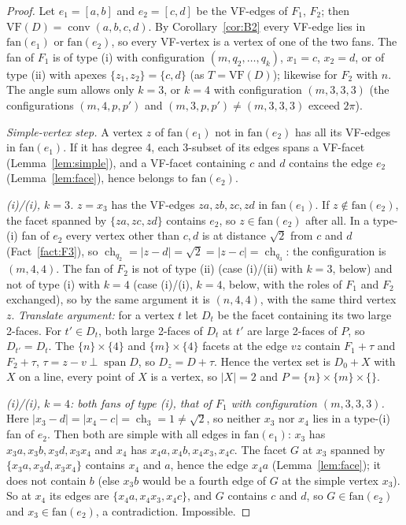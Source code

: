\documentclass[11pt]{article}
\theoremstyle{definition}
\theoremstyle{remark}
\newcommand{\VF}{\mathrm{VF}}
\newcommand{\conv}{\operatorname{conv}}
\newcommand{\spn}{\operatorname{span}}
\newcommand{\ch}{\operatorname{ch}}
\begin{document}
\begin{proof}
Let $e_1=[a,b]$ and $e_2=[c,d]$ be the VF-edges of $F_1$, $F_2$; then
$\VF(D)=\conv(a,b,c,d)$. By Corollary~\ref{cor:B2} every VF-edge lies in
$\mathrm{fan}(e_1)$ or $\mathrm{fan}(e_2)$, so every VF-vertex is a vertex of
one of the two fans. The fan of $F_1$ is of type (i) with configuration
$(m,q_2,\dots,q_k)$, $x_1=c$, $x_2=d$, or of type (ii) with apexes
$\{z_1,z_2\}=\{c,d\}$ (as $T=\VF(D)$); likewise for $F_2$ with $n$. The angle
sum allows only $k=3$, or $k=4$ with configuration $(m,3,3,3)$ (the
configurations $(m,4,p,p')$ and $(m,3,p,p')\ne(m,3,3,3)$ exceed $2\pi$).

\emph{Simple-vertex step.} A vertex $z$ of $\mathrm{fan}(e_1)$ not in
$\mathrm{fan}(e_2)$ has all its VF-edges in $\mathrm{fan}(e_1)$. If it has
degree 4, each 3-subset of its edges spans a VF-facet
(Lemma~\ref{lem:simple}), and a VF-facet containing $c$ and $d$ contains
the edge $e_2$ (Lemma~\ref{lem:face}), hence belongs to $\mathrm{fan}(e_2)$.

\emph{(i)/(i), $k=3$.} $z=x_3$ has the VF-edges $za,zb,zc,zd$ in
$\mathrm{fan}(e_1)$. If $z\notin\mathrm{fan}(e_2)$, the facet spanned by
$\{za,zc,zd\}$ contains $e_2$, so $z\in\mathrm{fan}(e_2)$ after all. In a
type-(i) fan of $e_2$ every vertex other than $c,d$ is at distance $\sqrt2$
from $c$ and $d$ (Fact~\ref{fact:F3}), so
$\ch_{q_2}=|z-d|=\sqrt2=|z-c|=\ch_{q_3}$: the configuration is $(m,4,4)$. The
fan of $F_2$ is not of type (ii) (case (i)/(ii) with $k=3$, below) and
not of type (i) with $k=4$ (case (i)/(i), $k=4$, below, with the roles of
$F_1$ and $F_2$ exchanged), so by the same argument it is $(n,4,4)$, with the
same third vertex $z$. \emph{Translate argument:} for a vertex $t$ let $D_t$ be the
facet containing its two large 2-faces. For $t'\in D_t$, both large 2-faces
of $D_t$ at $t'$ are large 2-faces of $P$, so $D_{t'}=D_t$. The
$\{n\}\times\{4\}$ and $\{m\}\times\{4\}$ facets at the edge $vz$ contain
$F_1+\tau$ and $F_2+\tau$, $\tau=z-v\perp\spn D$, so $D_z=D+\tau$. Hence the
vertex set is $D_0+X$ with $X$ on a line, every point of $X$ is a vertex, so
$|X|=2$ and $P=\{n\}\times\{m\}\times\{\}$.

\emph{(i)/(i), $k=4$: both fans of type (i), that of $F_1$ with
configuration $(m,3,3,3)$.} Here
$|x_3-d|=|x_4-c|=\ch_3=1\ne\sqrt2$, so neither $x_3$ nor $x_4$ lies in a
type-(i) fan of $e_2$. Then both are simple with all edges in
$\mathrm{fan}(e_1)$: $x_3$ has $x_3a,x_3b,x_3d,x_3x_4$ and $x_4$ has
$x_4a,x_4b,x_4x_3,x_4c$. The facet $G$ at $x_3$ spanned by
$\{x_3a,x_3d,x_3x_4\}$ contains $x_4$ and $a$, hence the edge $x_4a$
(Lemma~\ref{lem:face}); it does not contain $b$ (else $x_3b$ would be a
fourth edge of $G$ at the simple vertex $x_3$). So at $x_4$ its edges are
$\{x_4a,x_4x_3,x_4c\}$, and $G$ contains $c$ and $d$, so $G\in\mathrm{fan}(e_2)$
and $x_3\in\mathrm{fan}(e_2)$, a contradiction. Impossible.


\end{proof}
\end{document}
